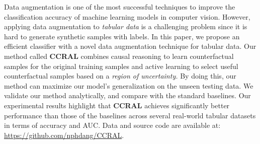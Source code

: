 Data augmentation is one of the most successful techniques to improve
the classification accuracy of machine learning models in computer
vision. However, applying data augmentation to \textit{tabular data}
is a challenging problem since it is hard to generate synthetic samples
with labels. In this paper, we propose an efficient classifier with
a novel data augmentation technique for tabular data. Our method called
\textbf{CCRAL} combines causal reasoning to learn counterfactual samples
for the original training samples and active learning to select useful
counterfactual samples based on a \textit{region of uncertainty.}
By doing this, our method can maximize our model's generalization
on the unseen testing data. We validate our method analytically, and
compare with the standard baselines. Our experimental results highlight
that \textbf{CCRAL} achieves significantly better performance than
those of the baselines across several real-world tabular datasets
in terms of accuracy and AUC. Data and source code are available at:
\url{https://github.com/nphdang/CCRAL}.
